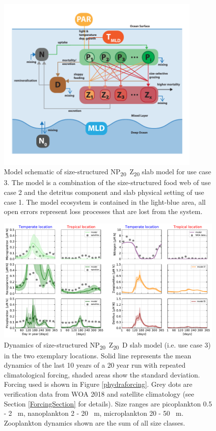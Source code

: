 \documentclass[template.tex]{subfiles}
\begin{document}
\begin{figure}[t]
\includegraphics[width=10cm]{Figures/firstdraft_schematics/03__schematics_SizeStructSlab.pdf}
\caption{Model schematic of size-structured \unit{NP_{20}Z_{20}} slab model for use case 3. The model is a combination of the size-structured food web of use case 2 and the detritus component and slab physical setting of use case 1. The model ecosystem is contained in the light-blue area, all open errors represent loss processes that are lost from the system.}
\label{Figure:phydraschematics_3}
\end{figure}



\begin{figure}[t]
\includegraphics[width=12cm]{Figures/firstdraft_plots/04_sizestruct_slab.pdf}
\caption{Dynamics of size-structured \unit{NP_{20}Z_{20}D} slab model (i.e. use case 3) in the two exemplary locations. Solid line represents the mean dynamics of the last 10 years of a 20 year run with repeated climatological forcing, shaded areas show the standard deviation. Forcing used is shown in Figure \ref{phydraforcing}. Grey dots are verification data from WOA 2018 and satellite climatology (see Section \ref{ForcingSection} for details). Size ranges are picoplankton 0.5 - 2 \unit{\mu m}, nanoplankton 2 - 20 \unit{\mu m}, microplankton 20 - 50 \unit{\mu m}. Zooplankton dynamics shown are the sum of all size classes.}
\label{Figure:SizeStructuredSlab_results}
\end{figure}

\clearpage

\biblio
\end{document}

